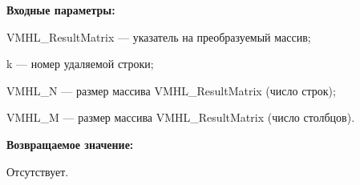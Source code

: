 \textbf{Входные параметры:}  
 
VMHL\_ResultMatrix --- указатель на преобразуемый массив;
 
k --- номер удаляемой строки;
 
VMHL\_N --- размер массива VMHL\_ResultMatrix (число строк);
 
VMHL\_M --- размер массива VMHL\_ResultMatrix (число столбцов).

\textbf{Возвращаемое значение:}

Отсутствует.